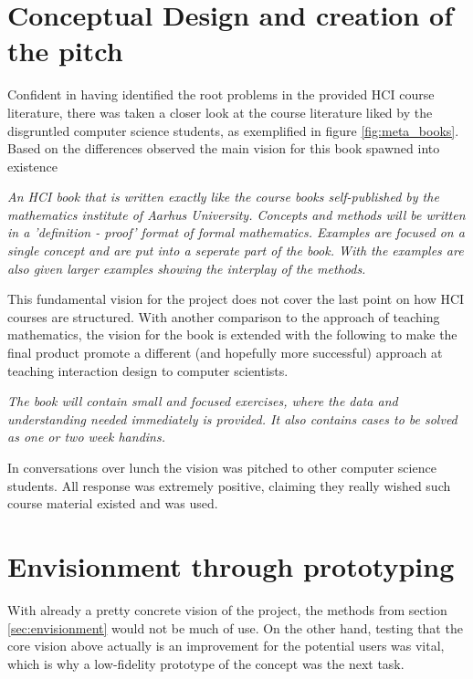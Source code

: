 

\section*{Conceptual Design and creation of the pitch}
Confident in having identified the root problems in the provided HCI course literature, there was taken a closer look at the course literature liked by the disgruntled computer science students, as exemplified in figure \ref{fig:meta_books}. Based on the differences observed the main vision for this book spawned into existence

\begin{displayquote}
  \emph{An HCI book that is written exactly like the course books self-published by the mathematics institute of Aarhus University. Concepts and methods will be written in a 'definition - proof' format of formal mathematics. Examples are focused on a single concept and are put into a seperate part of the book. With the examples are also given larger examples showing the interplay of the methods.}
\end{displayquote}

This fundamental vision for the project does not cover the last point on how HCI courses are structured. With another comparison to the approach of teaching mathematics, the vision for the book is extended with the following to make the final product promote a different (and hopefully more successful) approach at teaching interaction design to computer scientists.

\begin{displayquote}
  \emph{The book will contain small and focused exercises, where the data and understanding needed immediately is provided. It also contains cases to be solved as one or two week handins.}
\end{displayquote}

In conversations over lunch the vision was pitched to other computer science students. All response was extremely positive, claiming they really wished such course material existed and was used.

\section*{Envisionment through prototyping}
With already a pretty concrete vision of the project, the methods from section \ref{sec:envisionment} would not be much of use. On the other hand, testing that the core vision above actually is an improvement for the potential users was vital, which is why a low-fidelity prototype of the concept was the next task.

